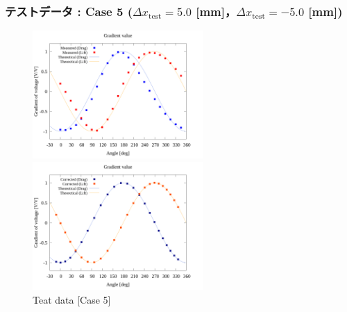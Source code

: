 \subsubsection{テストデータ : Case 5 ($\Delta x_\mathrm{test} = 5.0$ [mm]，$\Delta x_\mathrm{test} = -5.0$ [mm])}
\begin{figure}[htbp]
  \begin{minipage}[b]{0.45\linewidth}
    \centering
    \includegraphics[width=65mm]{../../02_workspace/result/offset_dx=5.0_dy=-5.0/plot/20/20_adjust-value.png}
  \end{minipage}
  \begin{minipage}[b]{0.45\linewidth}
    \centering
    \includegraphics[width=65mm]{../../02_workspace/result/offset_dx=5.0_dy=-5.0/plot/21/21-2_summary_offset.png}
  \end{minipage}
  \caption{Teat data [Case 5]}
\end{figure}

\newpage

